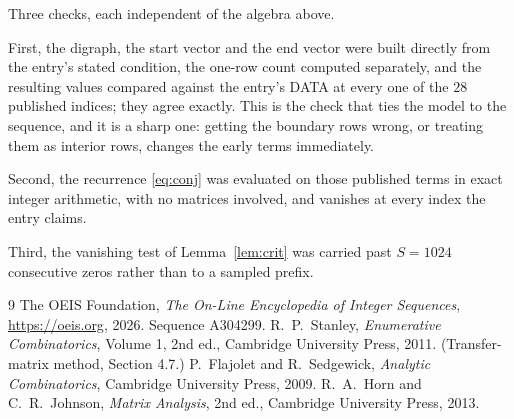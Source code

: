 \documentclass[11pt,a4paper]{article}
\theoremstyle{plain}
\theoremstyle{definition}
\begin{document}
Three checks, each independent of the algebra above.

First, the digraph, the start vector and the end vector were built directly from the
entry's stated condition, the one-row count computed separately, and the resulting values
compared against the entry's DATA at every one of the $28$ published indices; they
agree exactly. This is the check that ties the model to the sequence, and it is a sharp one:
getting the boundary rows wrong, or treating them as interior rows, changes the early terms
immediately.

Second, the recurrence \eqref{eq:conj} was evaluated on those published terms in exact
integer arithmetic, with no matrices involved, and vanishes at every index the entry claims.

Third, the vanishing test of Lemma~\ref{lem:crit} was carried past $S=1024$ consecutive
zeros rather than to a sampled prefix.

\begin{thebibliography}{9}
 The OEIS Foundation, \emph{The On-Line Encyclopedia of Integer
Sequences}, \url{https://oeis.org}, 2026. Sequence A304299.
 R.~P.~Stanley, \emph{Enumerative Combinatorics}, Volume 1, 2nd ed.,
Cambridge University Press, 2011. (Transfer-matrix method, Section 4.7.)
 P.~Flajolet and R.~Sedgewick, \emph{Analytic Combinatorics}, Cambridge
University Press, 2009.
 R.~A.~Horn and C.~R.~Johnson, \emph{Matrix Analysis}, 2nd ed., Cambridge
University Press, 2013.
\end{thebibliography}
\end{document}
